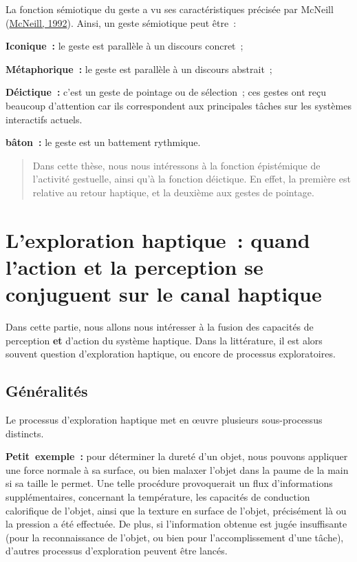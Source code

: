 \documentclass[
]{book}
\begin{document}
La fonction sémiotique du geste a vu ses caractéristiques précisée par
McNeill (\protect\hyperlink{ref-McNeill92}{McNeill, 1992}). Ainsi, un geste
sémiotique peut être~:

\textbf{Iconique~:}
le geste est parallèle à un discours
concret~;

\textbf{Métaphorique~:}
le geste est parallèle à un discours
abstrait~;

\textbf{Déictique~:}
c'est un geste de pointage ou de sélection~; ces
gestes ont reçu beaucoup d'attention car ils correspondent aux principales
tâches sur les systèmes interactifs actuels.

\textbf{bâton~:}
le geste est un battement rythmique.

\begin{quote}
Dans cette thèse, nous nous intéressons à la
fonction épistémique de l'activité gestuelle, ainsi qu'à la fonction
déictique. En effet, la première est relative au retour haptique, et la
deuxième aux gestes de pointage.
\end{quote}

\hypertarget{conjuguent}{%
\section{L'exploration haptique~: quand l'action et la perception se conjuguent sur le canal haptique}\label{conjuguent}}

Dans cette
partie, nous allons nous intéresser à la fusion des capacités de perception
\textbf{et} d'action du système haptique. Dans la littérature, il est alors
souvent question d'exploration haptique, ou encore de processus
exploratoires.

\hypertarget{guxe9nuxe9ralituxe9s}{%
\subsection{Généralités}\label{guxe9nuxe9ralituxe9s}}

Le processus d'exploration haptique met en œuvre plusieurs sous-processus
distincts.

\textbf{Petit~exemple~:}
pour déterminer la dureté d'un objet, nous
pouvons appliquer une force normale à sa surface, ou bien malaxer l'objet
dans la paume de la main si sa taille le permet. Une telle procédure
provoquerait un flux d'informations supplémentaires, concernant la
température, les capacités de conduction calorifique de l'objet, ainsi que
la texture en surface de l'objet, précisément là ou la pression a été
effectuée. De plus, si l'information obtenue est jugée insuffisante (pour
la reconnaissance de l'objet, ou bien pour l'accomplissement d'une tâche),
d'autres processus d'exploration peuvent être lancés.
\end{document}
